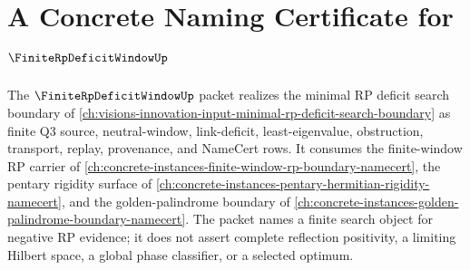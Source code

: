 \chapter{A Concrete Naming Certificate for $\FiniteRpDeficitWindowUp$}
\label{ch:concrete-instances-finite-rp-deficit-window-namecert}

The $\FiniteRpDeficitWindowUp$ packet realizes the minimal RP deficit search boundary of \autoref{ch:visions-innovation-input-minimal-rp-deficit-search-boundary} as finite Q3 source, neutral-window, link-deficit, least-eigenvalue, obstruction, transport, replay, provenance, and NameCert rows. It consumes the finite-window RP carrier of \autoref{ch:concrete-instances-finite-window-rp-boundary-namecert}, the pentary rigidity surface of \autoref{ch:concrete-instances-pentary-hermitian-rigidity-namecert}, and the golden-palindrome boundary of \autoref{ch:concrete-instances-golden-palindrome-boundary-namecert}. The packet names a finite search object for negative RP evidence; it does not assert complete reflection positivity, a limiting Hilbert space, a global phase classifier, or a selected optimum.

